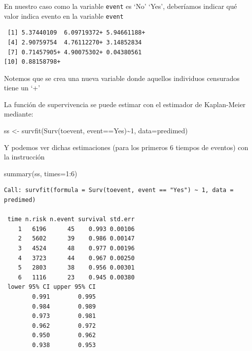 \documentclass[
]{book}
\newenvironment{Shaded}{\begin{snugshade}}{\end{snugshade}}
\newcommand{\AttributeTok}[1]{\textcolor[rgb]{0.77,0.63,0.00}{#1}}
\newcommand{\DecValTok}[1]{\textcolor[rgb]{0.00,0.00,0.81}{#1}}
\newcommand{\FunctionTok}[1]{\textcolor[rgb]{0.00,0.00,0.00}{#1}}
\newcommand{\NormalTok}[1]{#1}
\newcommand{\OtherTok}[1]{\textcolor[rgb]{0.56,0.35,0.01}{#1}}
\newcommand{\SpecialCharTok}[1]{\textcolor[rgb]{0.00,0.00,0.00}{#1}}
\newcommand{\StringTok}[1]{\textcolor[rgb]{0.31,0.60,0.02}{#1}}
\begin{document}
En nuestro caso como la variable \texttt{event} es `No' `Yes', deberíamos indicar qué valor indica evento en la variable \texttt{event}

\begin{Shaded}
\end{Shaded}

\begin{verbatim}
 [1] 5.37440109  6.09719372+ 5.94661188+
 [4] 2.90759754  4.76112270+ 3.14852834 
 [7] 0.71457905+ 4.90075302+ 0.04380561 
[10] 0.88158798+
\end{verbatim}

Notemos que se crea una nueva variable donde aquellos individuos censurados tiene un `+'

La función de supervivencia se puede estimar con el estimador de Kaplan-Meier mediante:

\begin{Shaded}
\begin{Highlighting}[]
\NormalTok{ss }\OtherTok{\textless{}{-}} \FunctionTok{survfit}\NormalTok{(}\FunctionTok{Surv}\NormalTok{(toevent, event}\SpecialCharTok{==}\StringTok{\textquotesingle{}Yes\textquotesingle{}}\NormalTok{)}\SpecialCharTok{\textasciitilde{}}\DecValTok{1}\NormalTok{, }\AttributeTok{data=}\NormalTok{predimed)}
\end{Highlighting}
\end{Shaded}

Y podemos ver dichas estimaciones (para los primeros 6 tiempos de eventos) con la instrucción

\begin{Shaded}
\begin{Highlighting}[]
\FunctionTok{summary}\NormalTok{(ss, }\AttributeTok{times=}\DecValTok{1}\SpecialCharTok{:}\DecValTok{6}\NormalTok{)}
\end{Highlighting}
\end{Shaded}

\begin{verbatim}
Call: survfit(formula = Surv(toevent, event == "Yes") ~ 1, data = predimed)

 time n.risk n.event survival std.err
    1   6196      45    0.993 0.00106
    2   5602      39    0.986 0.00147
    3   4524      48    0.977 0.00196
    4   3723      44    0.967 0.00250
    5   2803      38    0.956 0.00301
    6   1116      23    0.945 0.00380
 lower 95% CI upper 95% CI
        0.991        0.995
        0.984        0.989
        0.973        0.981
        0.962        0.972
        0.950        0.962
        0.938        0.953
\end{verbatim}
\end{document}
